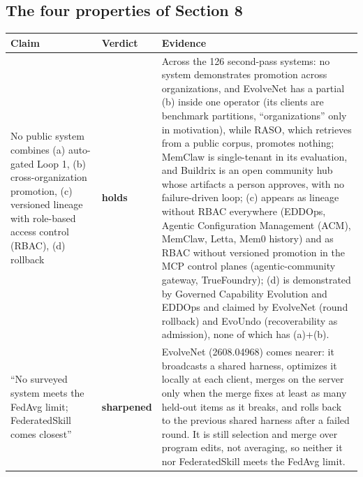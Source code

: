 \documentclass[
  11pt,
]{article}
\newcounter{none} %
\begin{document}
\subsection{The four properties of Section 8}\label{app:audit-1}

{\def\LTcaptype{none} %
\begin{longtable}[]{@{}
  >{\raggedright\arraybackslash}p{}
  >{\raggedright\arraybackslash}p{}
  >{\raggedright\arraybackslash}p{}@{}}
\toprule\noalign{}
\begin{minipage}[b]{\linewidth}\raggedright
Claim
\end{minipage} & \begin{minipage}[b]{\linewidth}\raggedright
Verdict
\end{minipage} & \begin{minipage}[b]{\linewidth}\raggedright
Evidence
\end{minipage} \\
\midrule\noalign{}
\endhead
\bottomrule\noalign{}
\endlastfoot
No public system combines (a) auto-gated Loop 1, (b) cross-organization promotion, (c) versioned lineage with role-based access control (RBAC), (d) rollback & \textbf{holds} & Across the 126 second-pass systems: no system demonstrates promotion across organizations, and EvolveNet has a partial (b) inside one operator (its clients are benchmark partitions, ``organizations'' only in motivation), while RASO, which retrieves from a public corpus, promotes nothing; MemClaw is single-tenant in its evaluation, and Buildrix is an open community hub whose artifacts a person approves, with no failure-driven loop; (c) appears as lineage without RBAC everywhere (EDDOps, Agentic Configuration Management (ACM), MemClaw, Letta, Mem0 history) and as RBAC without versioned promotion in the MCP control planes (agentic-community gateway, TrueFoundry); (d) is demonstrated by Governed Capability Evolution and EDDOps and claimed by EvolveNet (round rollback) and EvoUndo (recoverability as admission), none of which has (a)+(b). \\
``No surveyed system meets the FedAvg limit; FederatedSkill comes closest'' & \textbf{sharpened} & EvolveNet (2608.04968) comes nearer: it broadcasts a shared harness, optimizes it locally at each client, merges on the server only when the merge fixes at least as many held-out items as it breaks, and rolls back to the previous shared harness after a failed round. It is still selection and merge over program edits, not averaging, so neither it nor FederatedSkill meets the FedAvg limit. \\

\end{longtable}}
\end{document}
